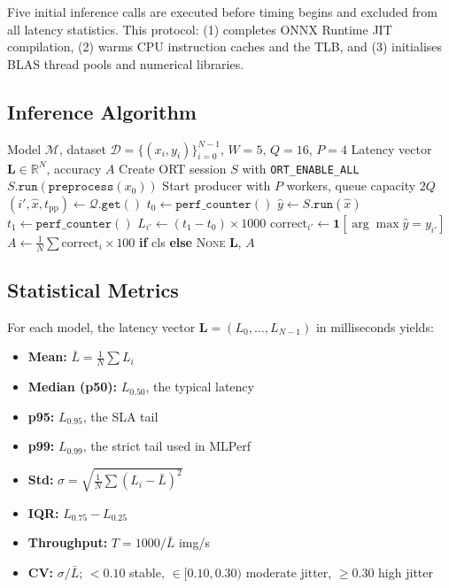 Five initial inference calls are executed before timing begins and excluded
from all latency statistics. This protocol: (1) completes ONNX Runtime JIT
compilation, (2) warms CPU instruction caches and the TLB, and (3) initialises
BLAS thread pools and numerical libraries.

\subsection{Inference Algorithm}

\begin{algorithm}[H]
\caption{Methodology~1 Baseline Inference Benchmark}
\label{alg:m1_inference}
\begin{algorithmic}[1]
\Require Model $\mathcal{M}$, dataset $\mathcal{D}=\{(x_i,y_i)\}_{i=0}^{N-1}$,
         $W=5$, $Q=16$, $P=4$
\Ensure Latency vector $\mathbf{L}\in\mathbb{R}^N$, accuracy $A$
\State Create ORT session $S$ with \texttt{ORT\_ENABLE\_ALL}
    \State $S.\texttt{run}(\texttt{preprocess}(x_0))$ 
\EndFor
\State Start producer with $P$ workers, queue capacity $2Q$
    \State $(i',\hat{x},t_\text{pp})\gets\mathcal{Q}.\texttt{get}()$
    \State $t_0\gets\texttt{perf\_counter}()$
    \State $\hat{y}\gets S.\texttt{run}(\hat{x})$
    \State $t_1\gets\texttt{perf\_counter}()$
    \State $L_{i'}\gets(t_1-t_0)\times1000$ 
        \State $\text{correct}_{i'}\gets\mathbf{1}[\arg\max\hat{y}=y_{i'}]$
    \EndIf
\EndFor
\State $A\gets\frac{1}{N}\sum\text{correct}_i\times100$ \textbf{if} cls \textbf{else} \textsc{None}
\State \Return $\mathbf{L}$, $A$
\end{algorithmic}
\end{algorithm}

\subsection{Statistical Metrics}

For each model, the latency vector $\mathbf{L}=(L_0,\ldots,L_{N-1})$ in
milliseconds yields:

\begin{itemize}[itemsep=1pt, topsep=3pt]
    \item \textbf{Mean:} $\bar{L}=\frac{1}{N}\sum L_i$
    \item \textbf{Median (p50):} $L_{0.50}$, the typical latency
    \item \textbf{p95:} $L_{0.95}$, the SLA tail
    \item \textbf{p99:} $L_{0.99}$, the strict tail used in MLPerf
    \item \textbf{Std:} $\sigma=\sqrt{\frac{1}{N}\sum(L_i-\bar{L})^2}$
    \item \textbf{IQR:} $L_{0.75}-L_{0.25}$
    \item \textbf{Throughput:} $T=1000/\bar{L}$ img/s
    \item \textbf{CV:} $\sigma/\bar{L}$; $<0.10$ stable, $\in[0.10,0.30)$
          moderate jitter, $\geq0.30$ high jitter
\end{itemize}

